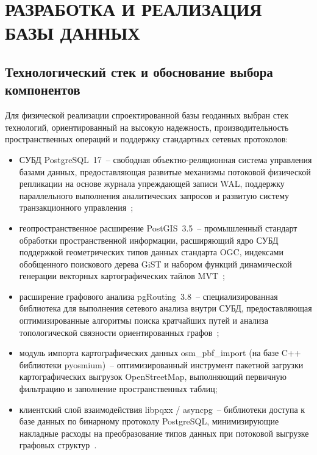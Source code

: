 \chapter{РАЗРАБОТКА И РЕАЛИЗАЦИЯ БАЗЫ ДАННЫХ}
\label{chap:database_implementation}

\section{Технологический стек и обоснование выбора компонентов}
\label{sec:tech_stack}

Для физической реализации спроектированной базы геоданных выбран стек технологий, ориентированный на высокую надежность, производительность пространственных операций и поддержку стандартных сетевых протоколов:
\begin{itemize}
    \item СУБД PostgreSQL~17~-- свободная объектно-реляционная система управления базами данных, предоставляющая развитые механизмы потоковой физической репликации на основе журнала упреждающей записи WAL, поддержку параллельного выполнения аналитических запросов и развитую систему транзакционного управления~\cite{postgrespro_mvcc_intro, postolenko2025_complexities};
    \item геопространственное расширение PostGIS~3.5~-- промышленный стандарт обработки пространственной информации, расширяющий ядро СУБД поддержкой геометрических типов данных стандарта OGC, индексами обобщенного поискового дерева GiST и набором функций динамической генерации векторных картографических тайлов MVT~\cite{lyashenko2019postgis, percona2025postgis};
    \item расширение графового анализа pgRouting~3.8~-- специализированная библиотека для выполнения сетевого анализа внутри СУБД, предоставляющая оптимизированные алгоритмы поиска кратчайших путей и анализа топологической связности ориентированных графов~\cite{basargin2021pgrouting, pgrouting2023advantages};
    \item модуль импорта картографических данных osm\_pbf\_import (на базе C++ библиотеки pyosmium)~-- оптимизированный инструмент пакетной загрузки картографических выгрузок OpenStreetMap, выполняющий первичную фильтрацию и заполнение пространственных таблиц;
    \item клиентский слой взаимодействия libpqxx / asyncpg~-- библиотеки доступа к базе данных по бинарному протоколу PostgreSQL, минимизирующие накладные расходы на преобразование типов данных при потоковой выгрузке графовых структур~\cite{habr2016asyncpg}.
\end{itemize}

